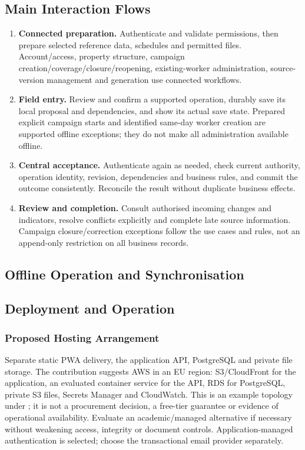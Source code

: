 \subsection{Main Interaction Flows}
\begin{enumerate}
\item \textbf{Connected preparation.} Authenticate and validate permissions, then
prepare selected reference data, schedules and permitted files. Account/access,
property structure, campaign creation/coverage/closure/reopening, existing-worker
administration, source-version management and generation use connected workflows.
\item \textbf{Field entry.} Review and confirm a supported operation, durably save
its local proposal and dependencies, and show its actual save state. Prepared
explicit campaign starts and identified same-day worker creation are supported
offline exceptions; they do not make all administration available offline.
\item \textbf{Central acceptance.} Authenticate again as needed, check current
authority, operation identity, revision, dependencies and business rules, and commit
the outcome consistently. Reconcile the result without duplicate business effects.
\item \textbf{Review and completion.} Consult authorised incoming changes and
indicators, resolve conflicts explicitly and complete late source information.
Campaign closure/correction exceptions follow the use cases and rules, not an
append-only restriction on all business records.
\end{enumerate}

\subsection{Offline Operation and Synchronisation}


\subsection{Deployment and Operation}
\subsubsection{Proposed Hosting Arrangement}
Separate static PWA delivery, the application API, PostgreSQL and private file
storage. The contribution suggests AWS in an EU region: S3/CloudFront for the
application, an evaluated container service for the API,
RDS for PostgreSQL, private S3 files, Secrets Manager and CloudWatch.
This is an example topology under ; it is not a procurement
decision, a free-tier guarantee or evidence of operational availability. Evaluate
an academic/managed alternative if necessary without weakening access, integrity
or document controls. Application-managed authentication is selected; choose the transactional email provider separately.

